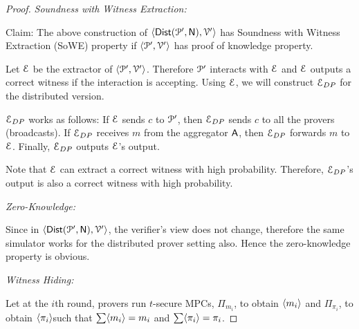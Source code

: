 \begin{proof}
	\textit{Soundness with Witness Extraction:}
	
	Claim: The above construction of $\langle \mathsf{Dist}(\mathcal{P}', \mathsf{N}), \mathcal{V}' \rangle$ has Soundness with Witness Extraction (SoWE) property if $\langle \mathcal{P}', \mathcal{V}' \rangle$ has proof of knowledge property. 
	
	Let $\mathcal{E}$ be the extractor of $\langle \mathcal{P}', \mathcal{V}' \rangle$. Therefore $\mathcal{P}'$ interacts with $\mathcal{E}$ and $\mathcal{E}$ outputs a correct witness if the interaction is accepting. Using $\mathcal{E}$, we will construct $\mathcal{E}_{DP}$ for the distributed version.
	
	$\mathcal{E}_{DP}$ works as follows:
	If $\mathcal{E}$ sends $c$ to $\mathcal{P}'$, then $\mathcal{E}_{DP}$ sends $c$ to all the provers (broadcasts).
	If $\mathcal{E}_{DP}$ receives $m$ from the aggregator $\mathsf{A}$, then $\mathcal{E}_{DP}$ forwards $m$ to $\mathcal{E}$. 
	Finally, $\mathcal{E}_{DP}$ outputs $\mathcal{E}$'s output.
	
	Note that $\mathcal{E}$ can extract a correct witness with high probability. Therefore, $\mathcal{E}_{DP}$'s output is also a correct witness with high probability.
	
	\textit{Zero-Knowledge:}
	
	Since in $\langle \mathsf{Dist}(\mathcal{P}', \mathsf{N}), \mathcal{V}' \rangle$, the verifier's view does not change, therefore the same simulator works for the distributed prover setting also. Hence the zero-knowledge property is obvious.
	
	\textit{Witness Hiding:} 
	
	Let at the $i$th round, provers run $t$-secure MPCs, $\Pi_{m_i}$, to obtain $\langle m_i \rangle$ and $\Pi_{\pi_i}$, to obtain $\langle \pi_i \rangle$such that $\sum \langle m_i \rangle = m_i$ and $\sum \langle \pi_i \rangle = \pi_i$.
	

\end{proof}
